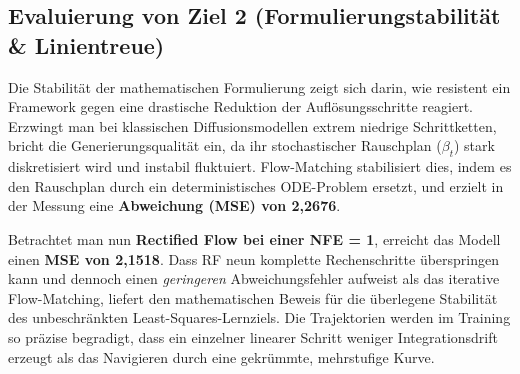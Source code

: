 \documentclass[11pt,a4paper]{article}
\begin{document}
\subsection{Evaluierung von Ziel 2 (Formulierungstabilität \& Linientreue)}
Die Stabilität der mathematischen Formulierung zeigt sich darin, wie resistent ein Framework gegen eine drastische Reduktion der Auflösungsschritte reagiert. Erzwingt man bei klassischen Diffusionsmodellen extrem niedrige Schrittketten, bricht die Generierungsqualität ein, da ihr stochastischer Rauschplan ($\beta_t$) stark diskretisiert wird und instabil fluktuiert. Flow-Matching stabilisiert dies, indem es den Rauschplan durch ein deterministisches ODE-Problem ersetzt, und erzielt in der Messung eine \textbf{Abweichung (MSE) von 2,2676}.

Betrachtet man nun \textbf{Rectified Flow bei einer NFE = 1}, erreicht das Modell einen \textbf{MSE von 2,1518}. Dass RF neun komplette Rechenschritte überspringen kann und dennoch einen \textit{geringeren} Abweichungsfehler aufweist als das iterative Flow-Matching, liefert den mathematischen Beweis für die überlegene Stabilität des unbeschränkten Least-Squares-Lernziels. Die Trajektorien werden im Training so präzise begradigt, dass ein einzelner linearer Schritt weniger Integrationsdrift erzeugt als das Navigieren durch eine gekrümmte, mehrstufige Kurve.
\end{document}

